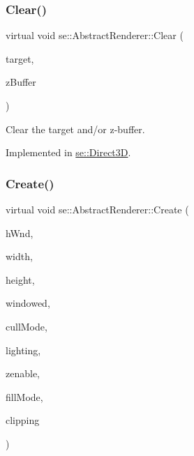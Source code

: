 \mbox{\label{classse_1_1_abstract_renderer_a2857e7bb3803682f94fb53e305da24e4}} 
\subsubsection{\texorpdfstring{Clear()}{Clear()}}
{\footnotesize\ttfamily virtual void se\+::\+Abstract\+Renderer\+::\+Clear (\begin{DoxyParamCaption}\item[{bool}]{target,  }\item[{bool}]{z\+Buffer }\end{DoxyParamCaption})\hspace{0.3cm}{\ttfamily [pure virtual]}}

Clear the target and/or z-\/buffer. 

Implemented in \mbox{\hyperlink{classse_1_1_direct3_d_a932f57e7ffc1ae9b796599a36e861d02}{se\+::\+Direct3D}}.

\mbox{\label{classse_1_1_abstract_renderer_a5c7e19127084d6bee7da63e3838d3c36}} 
\subsubsection{\texorpdfstring{Create()}{Create()}}
{\footnotesize\ttfamily virtual void se\+::\+Abstract\+Renderer\+::\+Create (\begin{DoxyParamCaption}\item[{H\+W\+ND}]{h\+Wnd,  }\item[{int}]{width,  }\item[{int}]{height,  }\item[{bool}]{windowed,  }\item[{\mbox{\hyperlink{namespacese_a2447de8e300e86ac4a8893e0486fc3bb}{Cull\+Mode}}}]{cull\+Mode,  }\item[{bool}]{lighting,  }\item[{bool}]{zenable,  }\item[{\mbox{\hyperlink{namespacese_a7ab38efb91dff288cc8279bedd6bc02c}{Fill\+Mode}}}]{fill\+Mode,  }\item[{bool}]{clipping }\end{DoxyParamCaption})\hspace{0.3cm}{\ttfamily [pure virtual]}}

